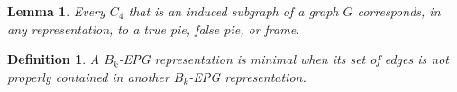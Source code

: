 \documentclass[9pt]{entcs}
\newtheorem{lema}{Lemma}[section]
\newtheorem{defi}{Definition}[section]
\newtheorem{prove}{Proof}[section]
\begin{document}
%


\begin{lema}\label{lem:representacaoC4}
\cite{golumbic2009} Every  $C_4$ that is an induced subgraph of a graph $ G $ corresponds, in any representation, to a true pie, false pie, or frame.
\end{lema}




\begin{defi}
A $B_k$-EPG representation is \emph{minimal} 
when its set of edges  is not properly contained in another $B_k$-EPG representation. 
\end{defi}
\end{document}
